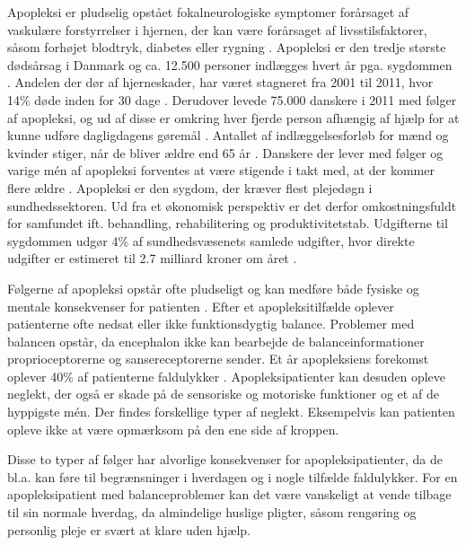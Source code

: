 Apopleksi er pludselig opstået fokalneurologiske symptomer forårsaget af vaskulære forstyrrelser i hjernen, der kan være forårsaget af livsstilsfaktorer, såsom forhøjet blodtryk, diabetes eller rygning \cite{Sundhedsstyrelsen2009,Academic2015}. Apopleksi er den tredje største dødsårsag i Danmark og ca. 12.500 personer indlægges hvert år pga. sygdommen \cite{Hjernesagen2015a}. Andelen der dør af hjerneskader, har været stagneret fra 2001 til 2011, hvor 14\% døde inden for 30 dage \cite{Hjernesagen2015}. Derudover levede 75.000 danskere i 2011 med følger af apopleksi, og ud af disse er omkring hver fjerde person afhængig af hjælp for at kunne udføre dagligdagens gøremål \cite{Hjernesagen2015a}. Antallet af indlæggelsesforløb for mænd og kvinder stiger, når de bliver ældre end 65 år \cite{Sundhedsstyrelsen2011}.
Danskere der lever med følger og varige mén af apopleksi forventes at være stigende i takt med, at der kommer flere ældre \cite{Sagen2014}. Apopleksi er den sygdom, der kræver flest plejedøgn i sundhedssektoren. Ud fra et økonomisk perspektiv er det derfor omkostningsfuldt for samfundet ift. behandling, rehabilitering og produktivitetstab.  Udgifterne til sygdommen udgør 4\% af sundhedsvæsenets samlede udgifter, hvor direkte udgifter er estimeret til 2.7 milliard kroner om året \cite{Hjernesagen2015a, Kruuse2014}.
 
Følgerne af apopleksi opstår ofte pludseligt og kan medføre både fysiske og mentale konsekvenser for patienten \cite{Muus2008}. Efter et apopleksitilfælde oplever  patienterne ofte nedsat eller ikke funktionsdygtig balance. Problemer med balancen opstår, da encephalon ikke kan bearbejde de balanceinformationer proprioceptorerne og sansereceptorerne sender. \cite{Karnath2003} Et år apopleksiens forekomst oplever 40\% af patienterne faldulykker \cite{Association2006}. 
Apopleksipatienter kan desuden opleve neglekt, der også er skade på de sensoriske og motoriske funktioner og et af de hyppigste mén. Der findes forskellige typer af neglekt. Eksempelvis kan patienten opleve ikke at være opmærksom på den ene side af kroppen. \cite{Sundhed.dk} 

Disse to typer af følger har alvorlige konsekvenser for apopleksipatienter, da de bl.a. kan føre til begrænsninger i hverdagen og i nogle tilfælde faldulykker. \cite{Muus2008,Nichols1997} For en apopleksipatient med balanceproblemer kan det være vanskeligt at vende tilbage til sin normale hverdag, da almindelige huslige pligter, såsom rengøring og personlig pleje er svært at klare uden hjælp. \cite{Sundhedsstyrelsen2010} \\  

